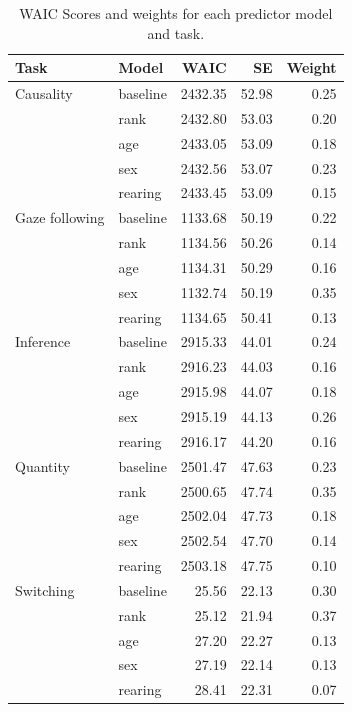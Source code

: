 \documentclass[10pt, letterpaper]{article}
\begin{document}
\begin{table}[H]
\centering
\begin{tabular}{llrrr}
  \hline
Task & Model & WAIC & SE & Weight \\ 
  \hline
Causality & baseline & 2432.35 & 52.98 & 0.25 \\ 
   & rank & 2432.80 & 53.03 & 0.20 \\ 
   & age & 2433.05 & 53.09 & 0.18 \\ 
   & sex & 2432.56 & 53.07 & 0.23 \\ 
   & rearing & 2433.45 & 53.09 & 0.15 \\ 
  Gaze following & baseline & 1133.68 & 50.19 & 0.22 \\ 
   & rank & 1134.56 & 50.26 & 0.14 \\ 
   & age & 1134.31 & 50.29 & 0.16 \\ 
   & sex & 1132.74 & 50.19 & 0.35 \\ 
   & rearing & 1134.65 & 50.41 & 0.13 \\ 
  Inference & baseline & 2915.33 & 44.01 & 0.24 \\ 
   & rank & 2916.23 & 44.03 & 0.16 \\ 
   & age & 2915.98 & 44.07 & 0.18 \\ 
   & sex & 2915.19 & 44.13 & 0.26 \\ 
   & rearing & 2916.17 & 44.20 & 0.16 \\ 
  Quantity & baseline & 2501.47 & 47.63 & 0.23 \\ 
   & rank & 2500.65 & 47.74 & 0.35 \\ 
   & age & 2502.04 & 47.73 & 0.18 \\ 
   & sex & 2502.54 & 47.70 & 0.14 \\ 
   & rearing & 2503.18 & 47.75 & 0.10 \\ 
  Switching & baseline & 25.56 & 22.13 & 0.30 \\ 
   & rank & 25.12 & 21.94 & 0.37 \\ 
   & age & 27.20 & 22.27 & 0.13 \\ 
   & sex & 27.19 & 22.14 & 0.13 \\ 
   & rearing & 28.41 & 22.31 & 0.07 \\ 
   \hline
\end{tabular}
\caption{WAIC Scores and weights for each predictor model and task.} 
\end{table}

\vspace{0.2em}

\vspace{0.2em}
\end{document}
